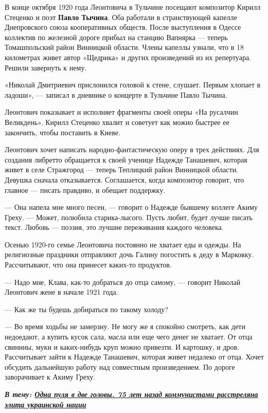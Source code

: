 В конце октября 1920 года Леонтовича в Тульчине посещают композитор Кирилл
Стеценко и поэт \textbf{Павло Тычина}. Оба работали в странствующей капелле
Днепровского союза кооперативных обществ. После выступления в Одессе коллектив
по железной дороге прибыл на станцию Вапнярка — теперь Томашпольский район
Винницкой области. Члены капеллы узнали, что в 18 километрах живет автор
«Щедрика» и других произведений из их репертуара. Решили завернуть к нему.

«Николай Дмитриевич прислонился головой к стене, слушает. Первым хлопает в
ладоши», — записал в дневнике о концерте в Тульчине Павло Тычина.

Леонтович показывает и исполняет фрагменты своей оперы «На русалчин Великдень».
Кирилл Стеценко хвалит и советует как можно быстрее ее закончить, чтобы
поставить в Киеве.

Леонтович хочет написать народно-фантастическую оперу в трех действиях. Для
создания либретто обращается к своей ученице Надежде Танашевич, которая живет в
селе Стражгород — теперь Теплицкий район Винницкой области. Девушка сначала
отказывается. Соглашается, когда композитор говорит, что главное — писать
правдиво, и обещает поддержку.

— Она напела мне много песен, — говорит о Надежде бывшему коллеге Акиму Греху.
— Может, полюбила старика-лысого. Пусть любит, будет лучше писать текст. Любовь
— поэзия, это лучшие переживания каждого человека.

Осенью 1920-го семье Леонтовича постоянно не хватает еды и одежды. На
религиозные праздники отправляют дочь Галину погостить к деду в Марковку.
Рассчитывают, что она принесет каких-то продуктов.

— Надо мне, Клава, как-то добраться до отца самому, — говорит Николай Леонтович
жене в начале 1921 года.

— Как же ты будешь добираться по такому холоду?

— Во время ходьбы не замерзну. Не могу же я спокойно смотреть, как дети
недоедают, а купить кусок сала, масла или еще чего денег не хватает. От отца
свинины, муки и каких-нибудь круп можно привезти. И картошку, и дров.
Рассчитывает зайти к Надежде Танашевич, которая живет недалеко от отца. Хочет
обсудить дальнейшую работу над совместным произведением. По дороге заворачивает
к Акиму Греху.

\begin{leftbar}
  \begingroup
    \em\Large\bfseries\color{blue}
В тему: \href{http://argumentua.com/stati/odna-pulya-v-dve-golovy-75-let-nazad-kommunistami-rasstrelyana-elita-ukrainskoi-natsii}{%
Одна пуля в две головы. 75 лет назад коммунистами расстреляна элита украинской нации}
  \endgroup
\end{leftbar}

